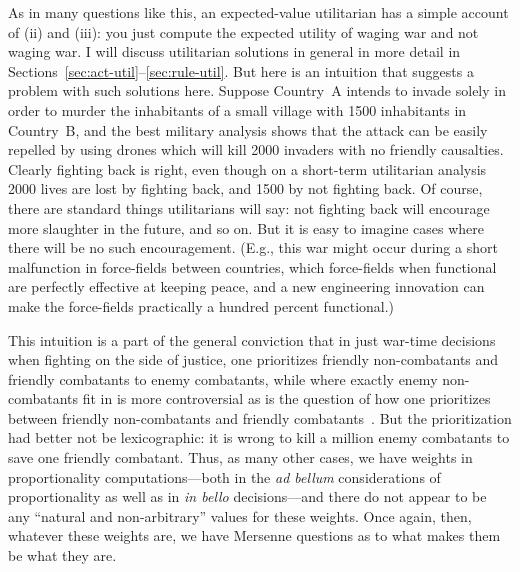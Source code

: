 As in many questions like this, 
an expected-value utilitarian has a simple account of (ii) and (iii): you just compute the expected utility 
of waging war and not waging war. I will discuss utilitarian solutions in general in more detail in Sections~\ref{sec:act-util}--\ref{sec:rule-util}. 
But here is an intuition that suggests a problem with such solutions here. Suppose Country~A intends
to invade solely in order to murder the inhabitants of a small village with 1500 inhabitants in Country~B, 
and the best military analysis shows that the attack can be easily repelled by using drones which will 
kill 2000 invaders with no friendly causalties. Clearly fighting back is right, even though on a short-term
utilitarian analysis 2000 lives are lost by fighting back, and 1500 by not fighting back. Of course, there 
are standard things utilitarians will say: not fighting back will encourage more slaughter in the future,
and so on. But it is easy to imagine cases where there will be no such encouragement. (E.g., this war might occur
during a short malfunction in force-fields between countries, which force-fields when functional are perfectly 
effective at keeping peace, and a new engineering innovation can make the force-fields practically a hundred
percent functional.)

This intuition is a part of the general conviction that in just war-time decisions when fighting on the side of
justice, one prioritizes friendly non-combatants
and friendly combatants to enemy combatants, while where exactly enemy non-combatants fit in is more controversial 
as is the question of how one prioritizes between friendly non-combatants and friendly combatants~\parencite{KasherYadlinMilitary, KasherYadlinAssassination, MargalitWalzer, McMahanInBello}.
But the prioritization had better not be lexicographic: it is wrong to kill a million enemy combatants to save one friendly combatant.
Thus, as many other cases, we have weights in proportionality computations---both in the \textit{ad bellum} considerations of 
proportionality as well as in \textit{in bello} decisions---and there do not appear to be any ``natural and non-arbitrary''
values for these weights. Once again, then, whatever these weights are, we have Mersenne questions as to what makes them 
be what they are.

